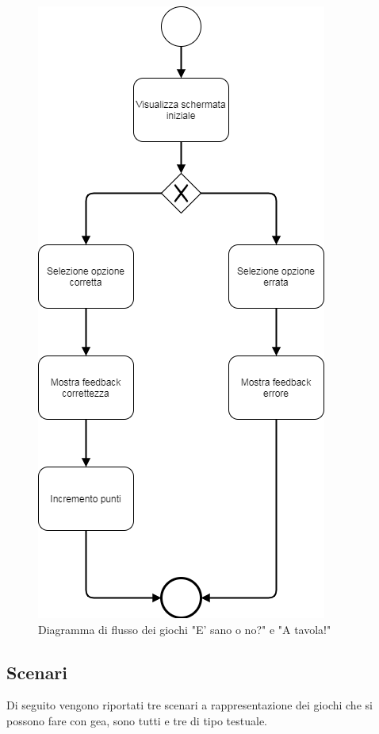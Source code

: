 \begin{figure}[htbp]
\centering
\includegraphics[scale=0.7]{Images/Flusso23}
\caption{Diagramma di flusso dei giochi "E' sano o no?" e "A tavola!"}
\label{fig:Diagramma di flusso dei giochi "E' sano o no?" e "A tavola!"}
\end{figure}
\clearpage

\subsection{Scenari} \label{scenari}
Di seguito vengono riportati tre scenari a rappresentazione dei giochi che si possono fare con \acs{gea}, sono tutti e tre di tipo testuale.
